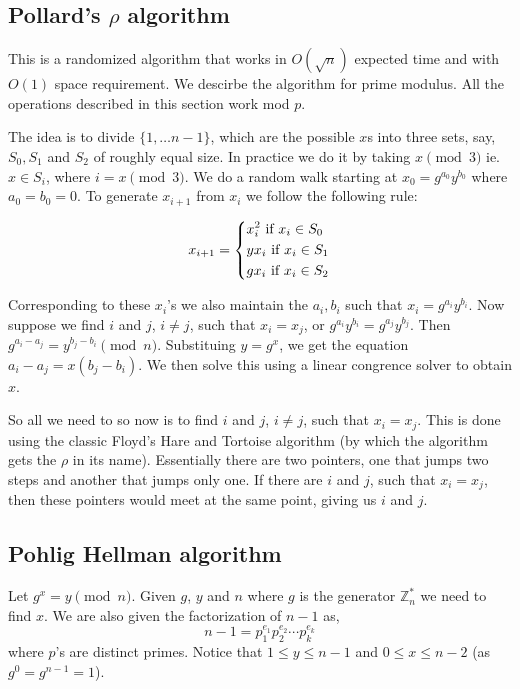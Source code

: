 \documentclass[letterpaper,12pt]{article}
\theoremstyle{remark}
\begin{document}
\subsection{Pollard's $\rho$ algorithm}

This is a randomized algorithm that works in $O(\sqrt{n})$ expected time and with $O(1)$ space requirement. We descirbe the algorithm for prime modulus. All the operations described in this section work mod $p$.

The idea is to divide $\{1, \dots n-1\}$, which are the possible $x$s into three sets, say, $S_0, S_1$ and $S_2$ of roughly equal size. In practice we do it by taking $x \pmod 3$ ie. $x \in S_i$, where $i = x \pmod 3$. We do a random walk starting at $x_0 = g^{a_0} y^{b_0}$ where $a_0 = b_0 = 0$. To generate $x_{i+1}$ from $x_i$ we follow the following rule:

\begin{equation*}
    x_{i+1} = 
    \begin{dcases}
        x_i^2 \text{ if } x_i \in S_0 \\
        yx_i \text{ if } x_i \in S_1 \\
        gx_i \text{ if } x_i \in S_2
    \end{dcases}
\end{equation*}

Corresponding to these $x_i$'s we also maintain the $a_i, b_i$ such that $x_i = g^{a_i} y^{b_i}$. Now suppose we find $i$ and $j$, $i \neq j$, such that $x_i = x_j$, or $g^{a_i} y^{b_i} = g^{a_j} y^{b_j}$. Then $g^{a_i - a_j} = y^{b_j - b_i} \pmod n$. Substituing $y = g^x$, we get the equation $a_i - a_j = x (b_j - b_i)$. We then solve this using a linear congrence solver to obtain $x$.

So all we need to so now is to find $i$ and $j$, $i \neq j$, such that $x_i = x_j$. This is done using the classic Floyd's Hare and Tortoise algorithm (by which the algorithm gets the $\rho$ in its name). Essentially there are two pointers, one that jumps two steps and another that jumps only one. If there are $i$ and $j$, such that $x_i = x_j$, then these pointers would meet at the same point, giving us $i$ and $j$.


\subsection{Pohlig Hellman algorithm}

Let $g^x = y \pmod n$. Given $g$, $y$ and $n$ where $g$ is the generator $\mathbb{Z}^*_{n}$ we need to find $x$. We are also given the factorization of $n-1$ as,
\begin{equation*}
    n-1 = p_1^{e_1} p_2^{e_2} \cdots p_k^{e_k}
\end{equation*}
where $p$'s are distinct primes. Notice that $1 \le y \le n-1$ and $0 \le x \le n-2$ (as $g^0 = g^{n-1} = 1$).
\end{document}
